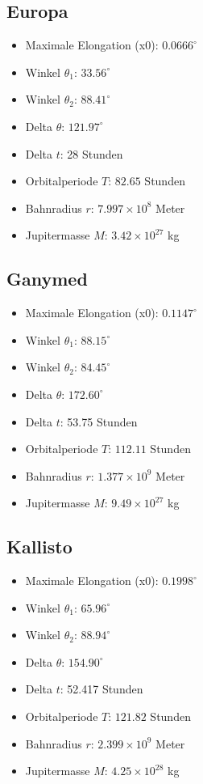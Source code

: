 \documentclass[a4paper,12pt]{article}
\begin{document}
\subsection*{Europa}
\begin{itemize}
    \item Maximale Elongation (x0): \( 0.0666^\circ \)
    \item Winkel \(\theta_1\): \( 33.56^\circ \)
    \item Winkel \(\theta_2\): \( 88.41^\circ \)
    \item Delta \(\theta\): \( 121.97^\circ \)
    \item Delta \(t\): 28 Stunden
    \item Orbitalperiode \(T\): \( 82.65 \) Stunden
    \item Bahnradius \(r\): \( 7.997 \times 10^8 \) Meter
    \item Jupitermasse \(M\): \( 3.42 \times 10^{27} \) kg
\end{itemize}

\subsection*{Ganymed}
\begin{itemize}
    \item Maximale Elongation (x0): \( 0.1147^\circ \)
    \item Winkel \(\theta_1\): \( 88.15^\circ \)
    \item Winkel \(\theta_2\): \( 84.45^\circ \)
    \item Delta \(\theta\): \( 172.60^\circ \)
    \item Delta \(t\): 53.75 Stunden
    \item Orbitalperiode \(T\): \( 112.11 \) Stunden
    \item Bahnradius \(r\): \( 1.377 \times 10^9 \) Meter
    \item Jupitermasse \(M\): \( 9.49 \times 10^{27} \) kg
\end{itemize}

\subsection*{Kallisto}
\begin{itemize}
    \item Maximale Elongation (x0): \( 0.1998^\circ \)
    \item Winkel \(\theta_1\): \( 65.96^\circ \)
    \item Winkel \(\theta_2\): \( 88.94^\circ \)
    \item Delta \(\theta\): \( 154.90^\circ \)
    \item Delta \(t\): 52.417 Stunden
    \item Orbitalperiode \(T\): \( 121.82 \) Stunden
    \item Bahnradius \(r\): \( 2.399 \times 10^9 \) Meter
    \item Jupitermasse \(M\): \( 4.25 \times 10^{28} \) kg
\end{itemize}
\end{document}
